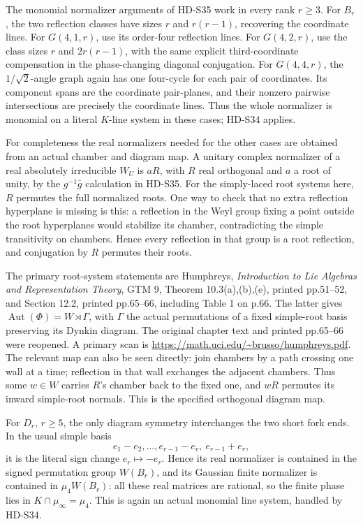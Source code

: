 The monomial normalizer arguments of HD-S35 work in every rank
\(r\ge3\). For \(B_r\), the two reflection classes have sizes
\(r\) and \(r(r-1)\), recovering the coordinate lines. For
\(G(4,1,r)\), use its order-four reflection lines. For
\(G(4,2,r)\), use the class sizes \(r\) and \(2r(r-1)\),
with the same explicit third-coordinate compensation in the
phase-changing diagonal conjugation. For \(G(4,4,r)\), the
\(1/\sqrt2\)-angle graph again has one four-cycle for each pair
of coordinates. Its component spans are the coordinate pair-planes,
and their nonzero pairwise intersections are precisely the coordinate
lines. Thus the whole normalizer is monomial on a literal
\(K\)-line system in these cases; HD-S34 applies.

For completeness the real normalizers needed for the other cases
are obtained from an actual chamber and diagram map. A unitary
complex normalizer of a real absolutely irreducible \(W_U\) is
\(aR\), with \(R\) real orthogonal and \(a\) a root of unity,
by the \(g^{-1}\bar g\) calculation in HD-S35. For the simply-laced
root systems here, \(R\) permutes the full normalized roots. One
way to check that no extra reflection hyperplane is missing is this:
a reflection in the Weyl group fixing a point outside the root
hyperplanes would stabilize its chamber, contradicting the simple
transitivity on chambers. Hence every reflection in that group is
a root reflection, and conjugation by \(R\) permutes their roots.

The primary root-system statements are Humphreys,
\emph{Introduction to Lie Algebras and Representation Theory},
GTM 9, Theorem 10.3(a),(b),(e), printed pp.51--52, and Section 12.2,
printed pp.65--66, including Table 1 on p.66. The latter gives
\(\operatorname{Aut}(\Phi)=W\rtimes\Gamma\), with \(\Gamma\)
the actual permutations of a fixed simple-root basis preserving its
Dynkin diagram. The original chapter text and printed pp.65--66
were reopened. A primary scan is
\url{https://math.uci.edu/~brusso/humphreys.pdf}.
The relevant map can also be seen directly: join chambers by a path
crossing one wall at a time; reflection in that wall exchanges the
adjacent chambers. Thus some \(w\in W\) carries \(R\)'s chamber
back to the fixed one, and \(wR\) permutes its inward simple-root
normals. This is the specified orthogonal diagram map.

For \(D_r\), \(r\ge5\), the only diagram symmetry interchanges
the two short fork ends. In the usual simple basis
\[
 e_1-e_2,\ldots,e_{r-1}-e_r,\ e_{r-1}+e_r,
\]
it is the literal sign change \(e_r\mapsto-e_r\). Hence its
real normalizer is contained in the signed permutation group
\(W(B_r)\), and its Gaussian finite normalizer is contained in
\(\mu_4W(B_r)\): all these real matrices are rational, so the
finite phase lies in \(K\cap\mu_\infty=\mu_4\). This is
again an actual monomial line system, handled by HD-S34.


